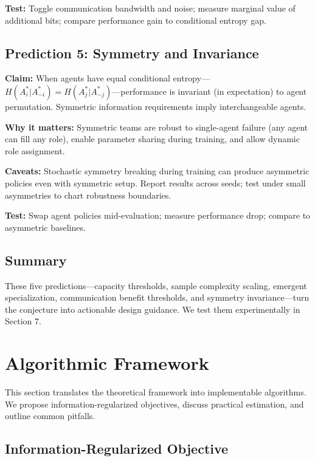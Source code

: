 \documentclass[10pt, letterpaper]{article}
\begin{document}
\textbf{Test:} Toggle communication bandwidth and noise; measure marginal value of additional bits; compare performance gain to conditional entropy gap.

\subsection{Prediction 5: Symmetry and Invariance}

\textbf{Claim:} When agents have equal conditional entropy---$H(A_i^*|A_{-i}^*) = H(A_j^*|A_{-j}^*)$---performance is invariant (in expectation) to agent permutation. Symmetric information requirements imply interchangeable agents.

\textbf{Why it matters:} Symmetric teams are robust to single-agent failure (any agent can fill any role), enable parameter sharing during training, and allow dynamic role assignment.

\textbf{Caveats:} Stochastic symmetry breaking during training can produce asymmetric policies even with symmetric setup. Report results across seeds; test under small asymmetries to chart robustness boundaries.

\textbf{Test:} Swap agent policies mid-evaluation; measure performance drop; compare to asymmetric baselines.

\subsection{Summary}

These five predictions---capacity thresholds, sample complexity scaling, emergent specialization, communication benefit thresholds, and symmetry invariance---turn the conjecture into actionable design guidance. We test them experimentally in Section 7.

\section{Algorithmic Framework}
\label{sec:algorithm}

This section translates the theoretical framework into implementable algorithms. We propose information-regularized objectives, discuss practical estimation, and outline common pitfalls.

\subsection{Information-Regularized Objective}
\end{document}
